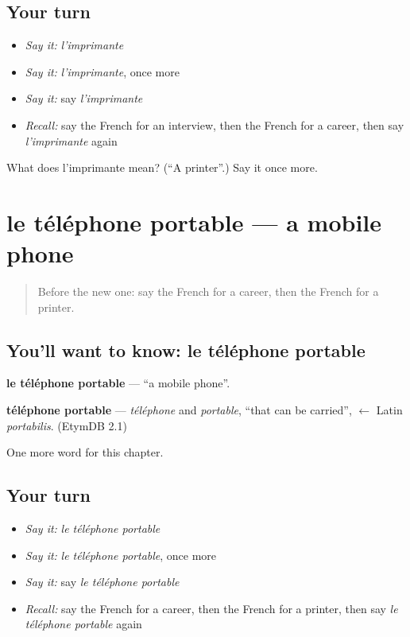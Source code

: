\subsection*{Your turn}
\begin{itemize}
\raggedright
  \item \emph{Say it:} \emph{l'imprimante}
  \item \emph{Say it:} \emph{l'imprimante}, once more
  \item \emph{Say it:} say \emph{l'imprimante}
  \item \emph{Recall:} say the French for an interview, then the French for a career, then say \emph{l'imprimante} again
\end{itemize}

\begin{tcolorbox}[breakable,colback=teal!4,colframe=teal!35!black,title={Before you move on}]
What does l'imprimante mean? (\textquotedblleft{}A printer\textquotedblright{}.) Say it once more.
\end{tcolorbox}
\section[le téléphone portable]{le téléphone portable — a mobile phone}

\label{lesson:FR-C204-telephone-portable}



\begin{quote}
Before the new one: say the French for a career, then the French for a printer.
\end{quote}

\subsection*{You'll want to know: le téléphone portable}
\textbf{le téléphone portable} — \textquotedblleft{}a mobile phone\textquotedblright{}.

\begin{cousinweb}
\textbf{téléphone portable} — \emph{téléphone} and \emph{portable}, \textquotedblleft{}that can be carried\textquotedblright{}, $\leftarrow$ Latin \emph{portabilis}. (EtymDB 2.1)
\end{cousinweb}

\begin{grammarlens}[title={What you've built}]
One more word for this chapter.
\end{grammarlens}

\subsection*{Your turn}
\begin{itemize}
\raggedright
  \item \emph{Say it:} \emph{le téléphone portable}
  \item \emph{Say it:} \emph{le téléphone portable}, once more
  \item \emph{Say it:} say \emph{le téléphone portable}
  \item \emph{Recall:} say the French for a career, then the French for a printer, then say \emph{le téléphone portable} again
\end{itemize}

